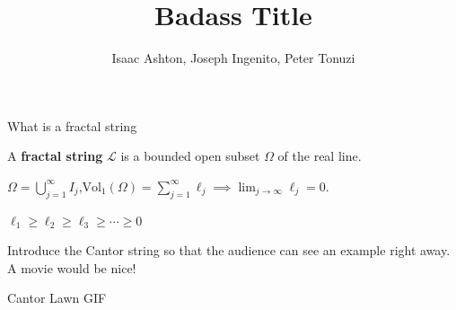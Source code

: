 \documentclass{if-beamer}
\title[]{Badass Title}
\subtitle{}
\author{Isaac Ashton, Joseph Ingenito, Peter Tonuzi}
\institute[]{The College of New Jersey}
\date{}
\begin{document}
\begin{frame}
  \titlepage
\end{frame}

\begin{frame}{What is a fractal string}

\begin{definition}
A {\bf fractal string} $\mathcal{L}$ is a bounded open subset $\Omega$ of the real line.
\end{definition}

\pause
\vspace{.2 in}

$\Omega = \displaystyle\bigcup_{j = 1}^\infty I_j$,\qquad $\displaystyle\text{Vol}_1\left(\Omega\right) = \sum_{j = 1}^\infty \ell_j \implies \lim_{j \to \infty} \ell_j = 0$.

\pause
\vspace{.2 in}

$\ell_1 \geq \ell_2 \geq \ell_3 \geq \cdots \geq 0$

\pause
\vspace{.2 in}

{\color{red} Introduce the Cantor string so that the audience can see an example right away. A movie would be nice!}

\end{frame}

\begin{frame}{Cantor Lawn GIF}
	\begin{center}
	\end{center}
\end{frame}
\end{document}
